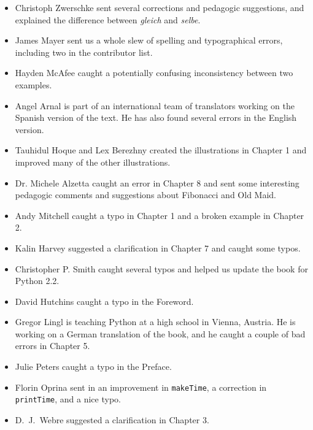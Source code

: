 \begin{itemize}
\item Christoph Zwerschke sent several corrections and
pedagogic suggestions, and explained the difference between {\em gleich}
and {\em selbe}.

\item James Mayer sent us a whole slew of spelling and
typographical errors, including two in the contributor list.

\item Hayden McAfee caught a potentially confusing inconsistency
between two examples.

\item Angel Arnal is part of an international team of translators
working on the Spanish version of the text.  He has also found several
errors in the English version.

\item Tauhidul Hoque and Lex Berezhny created the illustrations
in Chapter 1 and improved many of the other illustrations.

\item Dr. Michele Alzetta caught an error in Chapter 8 and sent
some interesting pedagogic comments and suggestions about Fibonacci
and Old Maid.

\item Andy Mitchell caught a typo in Chapter 1 and a broken example
in Chapter 2.

\item Kalin Harvey suggested a clarification in Chapter 7 and
caught some typos.

\item Christopher P. Smith caught several typos and helped us
update the book for Python 2.2.

\item David Hutchins caught a typo in the Foreword.

\item Gregor Lingl is teaching Python at a high school in Vienna,
Austria.  He is working on a German translation of the book,
and he caught a couple of bad errors in Chapter 5.

\item Julie Peters caught a typo in the Preface.

\item Florin Oprina sent in an improvement in {\tt makeTime},
a correction in {\tt printTime}, and a nice typo.

\item D.~J.~Webre suggested a clarification in Chapter 3.


\end{itemize}
